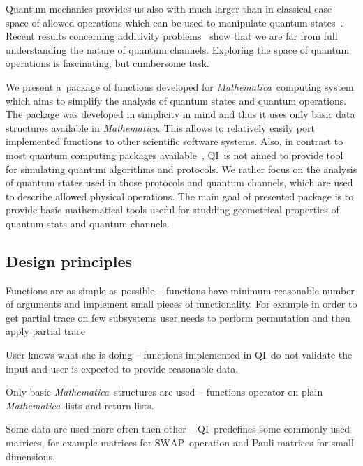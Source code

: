 \documentclass[a4paper,11pt]{elsart}
\newcommand{\Mathematica}{\emph{Mathematica}}
\newcommand{\1}{{\rm 1\hspace{-0.9mm}l}}
\newcommand{\SWAP}{\ensuremath{\mathrm{SWAP}}}
\newcommand{\qi}{QI}
\begin{document}
Quantum mechanics provides us also with much larger than in classical case space
of allowed operations which can be used to manipulate quantum
states~\cite{hayashi,BZ06}. Recent results concerning additivity
problems~\cite{hastings09superadditivity} show that we are far from full
understanding the nature of quantum channels. Exploring the space of quantum
operations is fascinating, but cumbersome task.

We present a~package of functions developed for \Mathematica\ computing system
which aims to simplify the analysis of quantum states and quantum operations.
The package was developed in simplicity in mind and thus it uses only basic data
structures available in \Mathematica. This allows to relatively easily port
implemented functions to other scientific software systems. Also, in contrast to
most quantum computing packages
available~\cite{qdensity,qucalc,quantum2,qcwave}, \qi\ is not aimed to provide
tool for simulating quantum algorithms and protocols. We rather focus on the
analysis of quantum states used in those protocols and quantum channels, which
are used to describe allowed physical operations. The main goal of presented
package is to provide basic mathematical tools useful for studding geometrical
properties of quantum stats and quantum channels.




\subsection{Design principles}

\begin{list}{\textbf{P}}{}
\item Functions are as simple as possible -- functions have minimum reasonable
number of arguments and implement small pieces of functionality. For example in
order to get partial trace on few subsystems user needs to perform permutation
and then apply partial trace 
\item User knows what she is doing -- functions implemented in \qi\ do not
validate the input and user is expected to provide reasonable data.
\item Only basic \Mathematica\ structures are used -- functions operator on
plain \Mathematica\ lists and return lists.
\item Some data are used more often then other -- \qi\ predefines some commonly
used matrices, for example matrices for \SWAP\ operation and Pauli matrices for
small dimensions.
\end{list}
\end{document}
